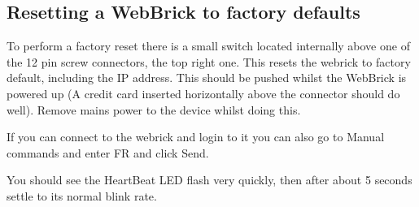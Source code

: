 \subsection{Resetting a WebBrick to factory defaults}

To perform a factory reset there is a small switch located internally above one of the 12 pin screw connectors, the top right one.
This resets the webrick to factory default, including the IP address. 
This should be pushed whilst the WebBrick is powered up (A credit card inserted horizontally above the connector should do well). 
Remove mains power to the device whilst doing this.

If you can connect to the webrick and login to it you can also go to Manual commands and enter FR and click Send.

You should see the HeartBeat LED flash very quickly, then after about 5 seconds settle to its normal blink rate.
